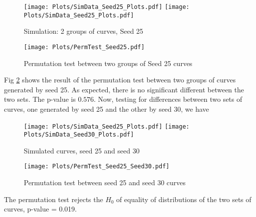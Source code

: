 \begin{figure}[H]
\begin{center}
\texttt{[image: Plots/SimData\_Seed25\_Plots.pdf]}
\texttt{[image: Plots/SimData\_Seed25\_Plots.pdf]}
\end{center}
\caption{Simulation: 2 groups of curves, Seed 25}
\label{fig:FigSim_2groupsSeed25}
\end{figure}
\begin{figure}[H]
\begin{center}
\texttt{[image: Plots/PermTest\_Seed25.pdf]}
\end{center}
\caption{Permutation test between two groups of Seed 25 curves}
\label{fig:Permtest_2groupsSeed25}
\end{figure}
Fig \ref{fig:Permtest_2groupsSeed25} shows the result of the permutation test between two groups of curves generated by seed 25. As expected, there is no significant different between the two sets. The p-value is $0.576$. Now, testing for differences between two sets of curves, one generated by seed 25 and the other by seed 30, we have
\begin{figure}[H]
\begin{center}
\texttt{[image: Plots/SimData\_Seed25\_Plots.pdf]}
\texttt{[image: Plots/SimData\_Seed30\_Plots.pdf]}
\end{center}
\caption{Simulated curves, seed 25 and seed 30}
\label{fig:FigSim_Seed25and30}
\end{figure}
\begin{figure}[H]
\begin{center}
\texttt{[image: Plots/PermTest\_Seed25\_Seed30.pdf]}
\end{center}
\caption{Permutation test between seed 25 and seed 30 curves}
\label{fig:Permtest_Seed25and30}
\end{figure}
The permutation test rejects the $H_0$ of equality of distributions of the two sets of curves, p-value = 0.019. 

